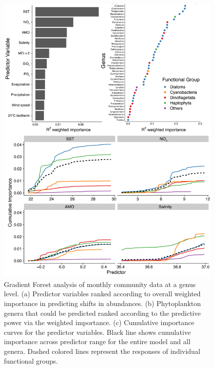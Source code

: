 \documentclass[draft]{agujournal2019}
\begin{document}
\begin{figure}
\noindent\includegraphics[width=\textwidth]{fig/FigureA3_GF_output_NOLAG_v1.pdf}
\caption{Gradient Forest analysis of monthly community data at a genus level. (a) Predictor variables ranked according to overall weighted importance in predicting shifts in abundances. (b) Phytoplankton genera that could be predicted ranked according to the predictive power via the weighted importance. (c) Cumulative importance curves for the predictor variables. Black line shows cumulative importance across predictor range for the entire model and all genera. Dashed colored lines represent the responses of individual functional groups.}
\label{fig:sup:GFoutput_nolags}
\end{figure}
\end{document}

